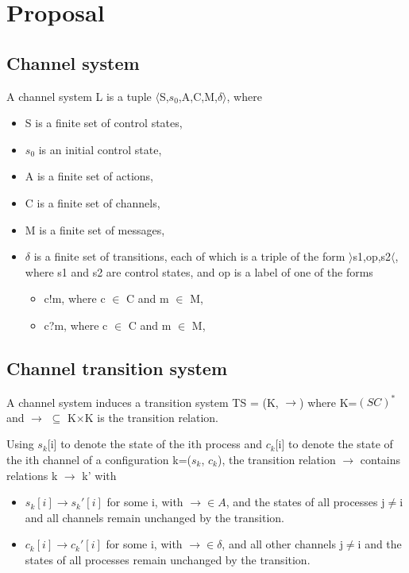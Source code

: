 \section{Proposal}
\subsection{Channel system}
A channel system L is a tuple $\langle$S,$s_0$,A,C,M,$\delta$$\rangle$, where
\begin{itemize}
\item[]
S is a finite set of control states,
\item[]
$s_0$ is an initial control state,
\item[]
A is a finite set of actions,
\item[]
C is a finite set of channels,
\item[]
M is a finite set of messages,
\item[]
$\delta$ is a finite set of transitions, each of which is a triple of the form $\rangle$s1,op,s2$\langle$, where s1 and s2 are control states, and op is a label of one of the forms

\begin{itemize}
\item
c!m, where c $\in$ C and m $\in$ M,
\item
c?m, where c $\in$ C and m $\in$ M,
\end{itemize}
\end{itemize}

\subsection{Channel transition system}

A channel system induces a transition system TS = (K, $\rightarrow$) where K=$(SC)^*$ and $\rightarrow$ $\subseteq$ K$\times$K is the transition relation.

Using $s_k$[i] to denote the state of the ith process and $c_k$[i] to denote the state of the ith channel of a configuration k=($s_k$, $c_k$), the transition relation $\rightarrow$ contains relations k $\rightarrow$ k' with

\begin{itemize}
  \item
    $s_k[i] \longrightarrow s_k'[i]$ for some i, with $\longrightarrow \in A$, and the states of all processes j$\neq$i and all channels remain unchanged by the transition.
  \item
    $c_k[i] \longrightarrow c_k'[i]$ for some i, with $\longrightarrow \in \delta$, and all other channels j$\neq$i and the states of all processes remain unchanged by the transition.
\end{itemize}

